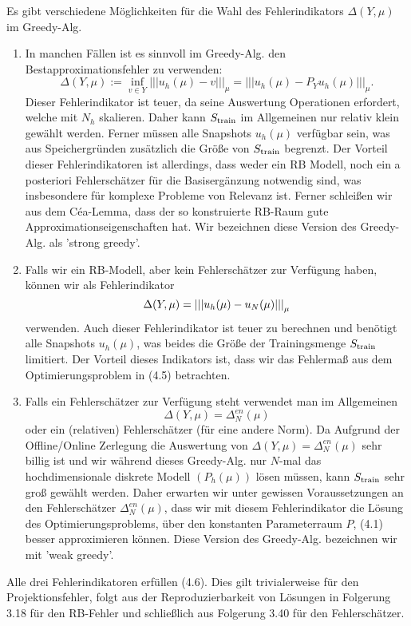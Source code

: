 Es gibt verschiedene Möglichkeiten für die Wahl des Fehlerindikators $\Delta(Y,\mu)$ im Greedy-Alg.
\begin{enumerate}[(1)]
	\item {} In manchen Fällen ist es sinnvoll im Greedy-Alg. den Bestapproximationsfehler zu verwenden:
	\[
	\Delta(Y,\mu) := \inf\limits_{v\in Y} |||u_h(\mu)-v|||_\mu = |||u_h(\mu)-P_Y u_h(\mu)|||_\mu.
	\]
	Dieser Fehlerindikator ist teuer, da seine Auswertung Operationen erfordert, welche mit $N_h$ skalieren.
	Daher kann $S_{\operatorname{train}}$ im Allgemeinen nur relativ klein gewählt werden.
	Ferner müssen alle Snapshots $u_h(\mu)$ verfügbar sein, was aus Speichergründen zusätzlich die Größe von $S_{\operatorname{train}}$ begrenzt.
	Der Vorteil dieser Fehlerindikatoren ist allerdings, dass weder ein RB Modell, noch ein a posteriori Fehlerschätzer für die Basisergänzung notwendig sind, was insbesondere für komplexe Probleme von Relevanz ist.
	Ferner schleißen wir aus dem Céa-Lemma, dass der so konstruierte RB-Raum gute Approximationseigenschaften hat.
	Wir bezeichnen diese Version des Greedy-Alg. als 'strong greedy'.
	\item {} Falls wir ein RB-Modell, aber kein Fehlerschätzer zur Verfügung haben, können wir als Fehlerindikator
	\[
	\Delta(Y,\mu) = \left|\left|\left|u_h(\mu)-u_N(\mu)\right|\right|\right|_\mu
	\]
	verwenden.
	Auch dieser Fehlerindikator ist teuer zu berechnen und benötigt alle Snapshots $u_h(\mu)$, was beides die Größe der Trainingsmenge $S_{\operatorname{train}}$ limitiert.
	Der Vorteil dieses Indikators ist, dass wir das Fehlermaß aus dem Optimierungsproblem in (4.5) betrachten.
	\item {} Falls ein Fehlerschätzer zur Verfügung steht verwendet man im Allgemeinen
	\[
	\Delta(Y,\mu) = \Delta_N^{en}(\mu)
	\]
	oder ein (relativen) Fehlerschätzer (für eine andere Norm). 
	Da Aufgrund der Offline/Online Zerlegung die Auswertung von $\Delta(Y,\mu) = \Delta_N^{en}(\mu)$ sehr billig ist und wir während dieses Greedy-Alg. nur $N$-mal das hochdimensionale diskrete Modell $(P_h(\mu))$ lösen müssen, kann $S_{\operatorname{train}}$ sehr groß gewählt werden.
	Daher erwarten wir unter gewissen Voraussetzungen an den Fehlerschätzer $\Delta_N^{en}(\mu)$, dass wir mit diesem Fehlerindikator die Lösung des Optimierungsproblems, über den konstanten Parameterraum $P$, (4.1) besser approximieren können.
	Diese Version des Greedy-Alg. bezeichnen wir mit 'weak greedy'.
\end{enumerate}
Alle drei Fehlerindikatoren erfüllen (4.6).
Dies gilt trivialerweise für den Projektionsfehler, folgt aus der Reproduzierbarkeit von Lösungen in Folgerung 3.18 für den RB-Fehler und schließlich aus Folgerung 3.40 für den Fehlerschätzer.

